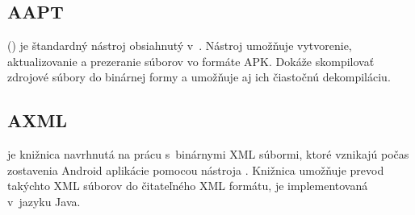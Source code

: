 \subsection{AAPT}
\label{AAPT}

 () je štandardný nástroj obsiahnutý v~. Nástroj  umožňuje vytvorenie, aktualizovanie a prezeranie súborov vo formáte APK. Dokáže skompilovať zdrojové súbory do binárnej formy a umožňuje aj ich čiastočnú dekompiláciu\cite{aapt}.

\subsection{AXML}
\label{AXML}
 je knižnica navrhnutá na prácu s~binárnymi XML súbormi, ktoré vznikajú počas zostavenia Android aplikácie pomocou nástroja . Knižnica umožňuje prevod takýchto XML súborov do čitateľného XML formátu, je implementovaná v~jazyku Java.

